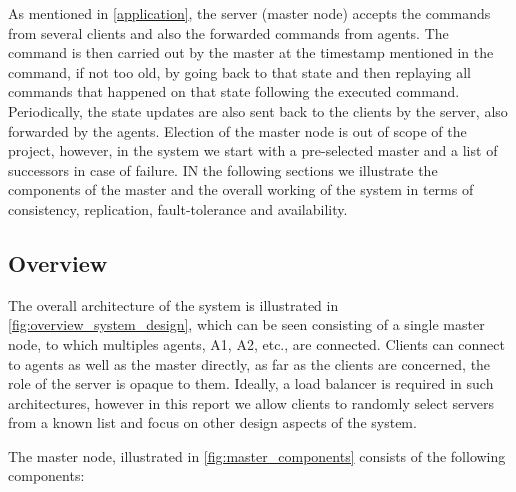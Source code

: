 \documentclass[a4paper]{IEEEtran}
\begin{document}
  As mentioned in \autoref{application}, the server (master node) accepts the commands from several clients and also the forwarded commands from agents. The command is then carried out by the master at the timestamp mentioned in the command, if not too old, by going back to that state and then replaying all commands that happened on that state following the executed command. Periodically, the state updates are also sent back to the clients by the server, also forwarded by the agents. Election of the master node is out of scope of the project, however, in the system we start with a pre-selected master and a list of successors in case of failure. IN the following sections we illustrate the components of the master and the overall working of the system in terms of consistency, replication, fault-tolerance and availability.

  \subsection{Overview} \label{system_design_overview}
  
  The overall architecture of the system is illustrated in \autoref{fig:overview_system_design}, which can be seen consisting of a single master node, to which multiples agents, A1, A2, etc., are connected. Clients can connect to agents as well as the master directly, as far as the clients are concerned, the role of the server is opaque to them. Ideally, a load balancer is required in such architectures, however in this report we allow clients to randomly select servers from a known list and focus on other design aspects of the system. 
  
  The master node, illustrated in \autoref{fig:master_components} consists of the following components:
  
\end{document}
